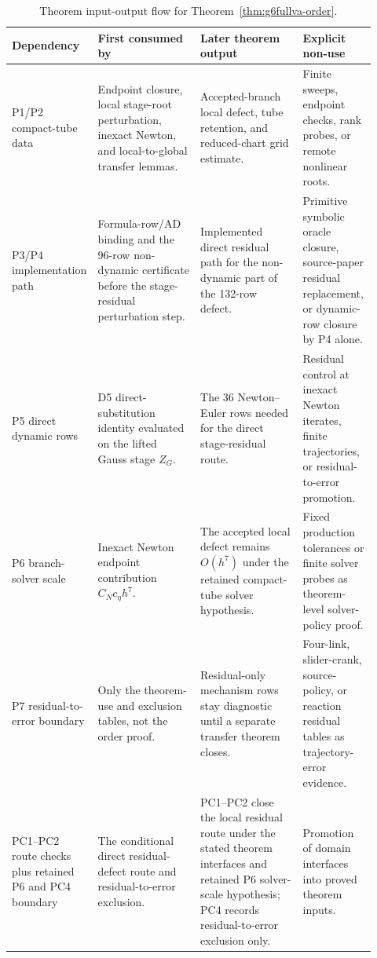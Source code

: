 \documentclass[preprint,12pt]{elsarticle}
\begin{document}
\begin{table}[htbp]
\centering
\caption{Theorem input-output flow for
Theorem~\ref{thm:g6fullva-order}.}
\label{tab:theorem-dependency-consumption-ledger}
\scriptsize
\setlength{\tabcolsep}{2pt}
\renewcommand{\arraystretch}{0.9}
\begin{tabular}{P{0.15\linewidth}P{0.29\linewidth}P{0.28\linewidth}P{0.20\linewidth}}
\toprule
Dependency & First consumed by & Later theorem output & Explicit non-use \\
\midrule
P1/P2 compact-tube data &
Endpoint closure, local stage-root perturbation, inexact Newton, and
local-to-global transfer lemmas. &
Accepted-branch local defect, tube retention, and reduced-chart grid estimate. &
Finite sweeps, endpoint checks, rank probes, or remote nonlinear roots. \\
P3/P4 implementation path &
Formula-row/AD binding and the 96-row non-dynamic certificate before the
stage-residual perturbation step. &
Implemented direct residual path for the non-dynamic part of the 132-row
defect. &
Primitive symbolic oracle closure, source-paper residual replacement, or
dynamic-row closure by P4 alone. \\
P5 direct dynamic rows &
D5 direct-substitution identity evaluated on the lifted Gauss stage \(Z_G\). &
The 36 Newton--Euler rows needed for the direct stage-residual route. &
Residual control at inexact Newton iterates, finite trajectories, or
residual-to-error promotion. \\
P6 branch-solver scale &
Inexact Newton endpoint contribution \(C_Nc_\eta h^7\). &
The accepted local defect remains \(O(h^7)\) under the retained
compact-tube solver hypothesis. &
Fixed production tolerances or finite solver probes as theorem-level
solver-policy proof. \\
P7 residual-to-error boundary &
Only the theorem-use and exclusion tables, not the order proof. &
Residual-only mechanism rows stay diagnostic until a separate transfer theorem
closes. &
Four-link, slider-crank, source-policy, or reaction residual tables as
trajectory-error evidence. \\
PC1--PC2 route checks plus retained P6 and PC4 boundary &
The conditional direct residual-defect route and residual-to-error exclusion. &
PC1--PC2 close the local residual route under the stated theorem interfaces
and retained P6 solver-scale hypothesis; PC4 records residual-to-error exclusion only. &
Promotion of domain interfaces into proved theorem inputs. \\
\bottomrule
\end{tabular}
\end{table}
\end{document}
